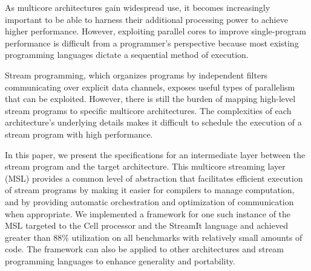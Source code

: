 %
%
%
%
%
%
%
%
%
%
%
% 
% 
%

As multicore architectures gain widespread use, it becomes
increasingly important to be able to harness their additional processing
power to achieve higher performance. However, exploiting parallel
cores to improve single-program performance is difficult from a
programmer's perspective because most existing programming languages
dictate a sequential method of execution.

Stream programming, which organizes programs by independent filters
communicating over explicit data channels,  exposes useful types of
parallelism that can be exploited. However, there is still the burden
of mapping high-level stream programs to specific multicore
architectures. The complexities of each architecture's underlying
details makes it difficult to schedule the execution of a stream
program with high performance.

In this paper, we present the specifications for an intermediate layer
between the stream program and the target architecture. This multicore
streaming layer (MSL) provides a common level of abstraction that
facilitates efficient execution of stream programs by making it easier
for compilers to manage computation, and by providing automatic
orchestration and optimization of communication when appropriate. We
implemented a framework for one such instance of the MSL targeted to
the Cell processor and the StreamIt language and achieved greater than
88\% utilization on all benchmarks with relatively small amounts of
code. The framework can also be applied to other architectures and
stream programming languages to enhance generality and portability.

